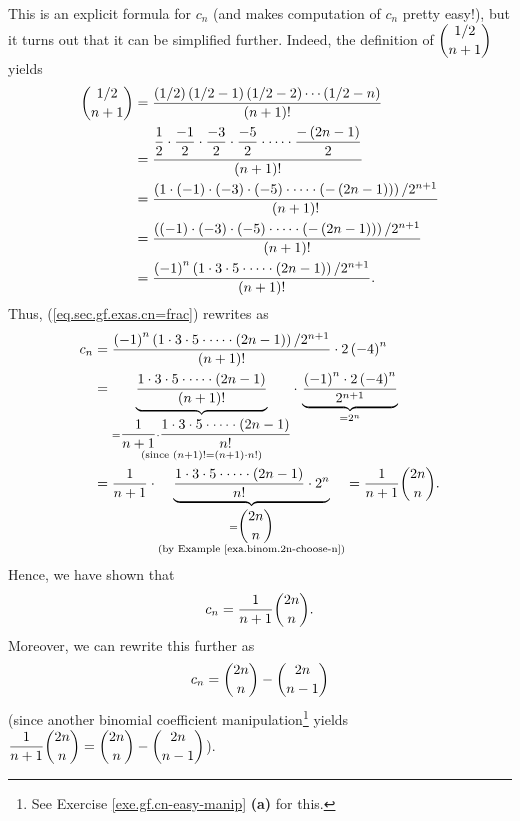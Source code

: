 This is an explicit formula for $c_{n}$ (and makes computation of $c_{n}$
pretty easy!), but it turns out that it can be simplified further. Indeed, the
definition of $\dbinom{1/2}{n+1}$ yields%
\begin{align*}
\dbinom{1/2}{n+1}  &  =\dfrac{\left(  1/2\right)  \left(  1/2-1\right)
\left(  1/2-2\right)  \cdots\left(  1/2-n\right)  }{\left(  n+1\right)  !}\\
&  =\dfrac{\vphantom{\dfrac{f}{f}}\dfrac{1}{2}\cdot\dfrac{-1}{2}\cdot
\dfrac{-3}{2}\cdot\dfrac{-5}{2}\cdot\cdots\cdot\dfrac{-\left(  2n-1\right)
}{2}}{\left(  n+1\right)  !}\\
&  =\dfrac{\left(  1\cdot\left(  -1\right)  \cdot\left(  -3\right)
\cdot\left(  -5\right)  \cdot\cdots\cdot\left(  -\left(  2n-1\right)  \right)
\right)  /2^{n+1}}{\left(  n+1\right)  !}\\
&  =\dfrac{\left(  \left(  -1\right)  \cdot\left(  -3\right)  \cdot\left(
-5\right)  \cdot\cdots\cdot\left(  -\left(  2n-1\right)  \right)  \right)
/2^{n+1}}{\left(  n+1\right)  !}\\
&  =\dfrac{\left(  -1\right)  ^{n}\left(  1\cdot3\cdot5\cdot\cdots\cdot\left(
2n-1\right)  \right)  /2^{n+1}}{\left(  n+1\right)  !}.
\end{align*}
Thus, (\ref{eq.sec.gf.exas.cn=frac}) rewrites as
\begin{align*}
c_{n}  &  =\dfrac{\left(  -1\right)  ^{n}\left(  1\cdot3\cdot5\cdot\cdots
\cdot\left(  2n-1\right)  \right)  /2^{n+1}}{\left(  n+1\right)  !}%
\cdot2\left(  -4\right)  ^{n}\\
&  =\underbrace{\dfrac{1\cdot3\cdot5\cdot\cdots\cdot\left(  2n-1\right)
}{\left(  n+1\right)  !}}_{\substack{=\dfrac{1}{n+1}\cdot\dfrac{1\cdot
3\cdot5\cdot\cdots\cdot\left(  2n-1\right)  }{n!}\\\text{(since }\left(
n+1\right)  !=\left(  n+1\right)  \cdot n!\text{)}}}\cdot\,\underbrace{\dfrac
{\left(  -1\right)  ^{n}\cdot2\left(  -4\right)  ^{n}}{2^{n+1}}}_{=2^{n}}\\
&  =\dfrac{1}{n+1}\cdot\underbrace{\dfrac{1\cdot3\cdot5\cdot\cdots\cdot\left(
2n-1\right)  }{n!}\cdot2^{n}}_{\substack{=\dbinom{2n}{n}\\\text{(by Example
\ref{exa.binom.2n-choose-n})}}}=\dfrac{1}{n+1}\dbinom{2n}{n}.
\end{align*}
Hence, we have shown that
\begin{equation}
c_{n}=\dfrac{1}{n+1}\dbinom{2n}{n}. \label{eq.sec.gf.exas.cn=1/(n+1)}%
\end{equation}
Moreover, we can rewrite this further as%
\begin{equation}
c_{n}=\dbinom{2n}{n}-\dbinom{2n}{n-1} \label{eq.sec.gf.exas.cn=diff}%
\end{equation}
(since another binomial coefficient manipulation\footnote{See Exercise
\ref{exe.gf.cn-easy-manip} \textbf{(a)} for this.} yields $\dfrac{1}%
{n+1}\dbinom{2n}{n}=\dbinom{2n}{n}-\dbinom{2n}{n-1}$).

